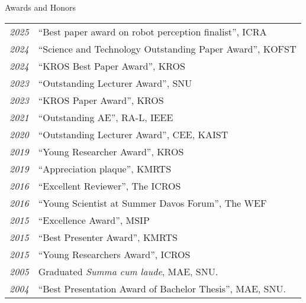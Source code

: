 \begin{rSection}{Awards and Honors}
    \begin{tabular}{ @{} >{\itshape}l @{\hspace{6ex}} l }
    2025        & ``Best paper award on robot perception finalist'', ICRA\\
    2024        & ``Science and Technology Outstanding Paper Award'', \acs{KOFST}\\
    2024        & ``KROS Best Paper Award'', \ac{KROS}\\
    2023        & ``Outstanding Lecturer Award'', SNU\\
    2023        & ``KROS Paper Award'', \ac{KROS}\\
    2021        & ``Outstanding AE'', RA-L, IEEE\\
    2020        & ``Outstanding Lecturer Award'', CEE, KAIST\\
    2019        & ``Young Researcher Award'', \ac{KROS}\\
    2019        & ``Appreciation plaque'', \ac{KMRTS}\\
    2016        & ``Excellent Reviewer'', The \ac{ICROS} \\
    2016        & ``Young Scientist at Summer Davos Forum'', The \ac{WEF} \\
    2015        & ``Excellence Award'', \ac{MSIP} \\
    2015        & ``Best Presenter Award'', \ac{KMRTS}\\
    2015        & ``Young Researchers Award'', \ac{ICROS} \\
    2005        & Graduated {\em Summa cum laude}, MAE, SNU. \\
    2004        & ``Best Presentation Award of Bachelor Thesis'', MAE, SNU. \\
    \end{tabular}
\end{rSection}
